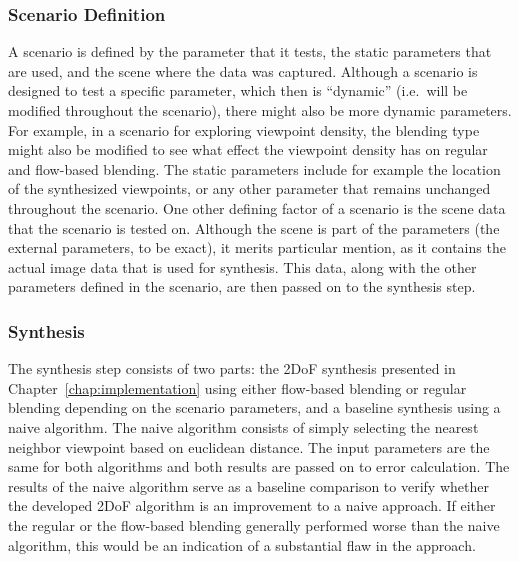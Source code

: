 \subsubsection{Scenario Definition}
A scenario is defined by the parameter that it tests, the static parameters that are used, and the scene where the data was captured. Although a scenario is designed to test a specific parameter, which then is ``dynamic'' (i.e.\ will be modified throughout the scenario), there might also be more dynamic parameters. For example, in a scenario for exploring viewpoint density, the blending type might also be modified to see what effect the viewpoint density has on regular and flow-based blending. The static parameters include for example the location of the synthesized viewpoints, or any other parameter that remains unchanged throughout the scenario. One other defining factor of a scenario is the scene data that the scenario is tested on. Although the scene is part of the parameters (the external parameters, to be exact), it merits particular mention, as it contains the actual image data that is used for synthesis. This data, along with the other parameters defined in the scenario, are then passed on to the synthesis step.



\subsubsection{Synthesis}
The synthesis step consists of two parts: the 2DoF synthesis presented in Chapter~\ref{chap:implementation} using either flow-based blending or regular blending depending on the scenario parameters, and a baseline synthesis using a naive algorithm.
The naive algorithm consists of simply selecting the nearest neighbor viewpoint based on euclidean distance. The input parameters are the same for both algorithms and both results are passed on to error calculation.
The results of the naive algorithm serve as a baseline comparison to verify whether the developed 2DoF algorithm is an improvement to a naive approach. If either the regular or the flow-based blending generally performed worse than the naive algorithm, this would be an indication of a substantial flaw in the approach.

